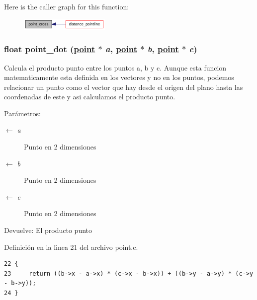 Here is the caller graph for this function:\begin{figure}[H]
\begin{center}
\leavevmode
\includegraphics[width=122pt]{group__geometry_gb97527165a510655ee37cd3ccfa8d932_gb97527165a510655ee37cd3ccfa8d932_icgraph}
\end{center}
\end{figure}
\hypertarget{group__geometry_ga7ae8d919209fea43e8a61215398bbbe_ga7ae8d919209fea43e8a61215398bbbe}{
\subsubsection[point\_\-dot]{\setlength{\rightskip}{0pt plus 5cm}float point\_\-dot (\hyperlink{struct__point}{point} $\ast$ {\em a}, \hyperlink{struct__point}{point} $\ast$ {\em b}, \hyperlink{struct__point}{point} $\ast$ {\em c})}}
\label{group__geometry_ga7ae8d919209fea43e8a61215398bbbe_ga7ae8d919209fea43e8a61215398bbbe}


Calcula el producto punto entre los puntos a, b y c. Aunque esta funcion matematicamente esta definida en los vectores y no en los puntos, podemos relacionar un punto como el vector que hay desde el origen del plano hasta las coordenadas de este y asi calculamos el producto punto.

\begin{Desc}
\item[Par\'{a}metros:]
\begin{description}
\item[\mbox{$\leftarrow$} {\em a}]Punto en 2 dimensiones \item[\mbox{$\leftarrow$} {\em b}]Punto en 2 dimensiones \item[\mbox{$\leftarrow$} {\em c}]Punto en 2 dimensiones \end{description}
\end{Desc}
\begin{Desc}
\item[Devuelve:]El producto punto \end{Desc}


Definici\'{o}n en la l\'{\i}nea 21 del archivo point.c.

\begin{Code}\begin{verbatim}22 {
23     return ((b->x - a->x) * (c->x - b->x)) + ((b->y - a->y) * (c->y - b->y));
24 }
\end{verbatim}\end{Code}




